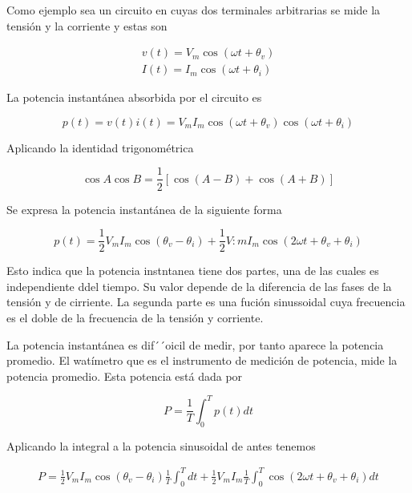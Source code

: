 Como ejemplo sea un circuito en cuyas dos terminales arbitrarias se mide la tensión y la corriente y estas son

\begin{eqnarray*}
    v(t) = V_m \cos (\omega t + \theta_v) \\
    I(t) = I_m \cos (\omega t + \theta_i)
\end{eqnarray*}

La potencia instantánea absorbida por el circuito es 

\begin{equation*}
p(t) = v(t) i(t) = V_m I_m \cos (\omega t + \theta_v) \cos (\omega t + \theta_i)
\end{equation*}

Aplicando la identidad trigonométrica 

\begin{equation*}
\cos A \cos B = \frac{1}{2} [\cos(A-B) + \cos (A+B)]
\end{equation*}

Se expresa la potencia instantánea de la siguiente forma

\begin{equation*}
p(t) = \frac{1}{2} V_m I_m \cos (\theta_v - \theta_i) + \frac{1}{2}V:m I_m \cos (2 \omega t + \theta_v + \theta_i)
\end{equation*}

Esto indica que la potencia instntanea tiene dos partes, una de las cuales es independiente ddel tiempo. Su valor depende de la diferencia de las fases de la tensión y de cirriente. La segunda parte es una fución sinussoidal cuya frecuencia es el doble de la frecuencia de la tensión y corriente.

La potencia instantánea es dif´´oicil de medir, por tanto aparece la potencia promedio. El watímetro que es el instrumento de medición de potencia, mide la potencia promedio. Esta potencia está dada por

\begin{equation*}
P = \frac{1}{T} \int_0^T p(t) dt
\end{equation*}

Aplicando la integral a la potencia sinusoidal de antes tenemos 

\begin{eqnarray*}
P = \frac{1}{2}V_m I_m \cos(\theta_v - \theta_i) \frac{1}{T} \int_0^T dt +  \frac{1}{2}V_m I_m \frac{1}{T} \int_0^T \cos (2 \omega t + \theta_v + \theta_i) dt 
\end{eqnarray*}

